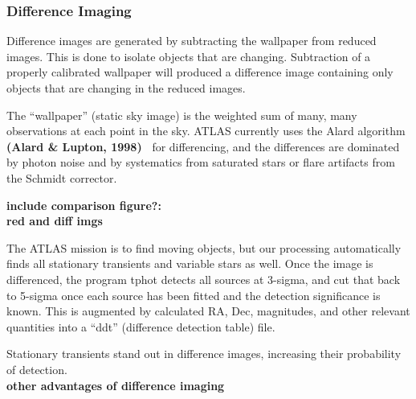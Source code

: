 \documentclass[aps,prb,twocolumn,superscriptaddress]{revtex4-1}
\begin{document}
\subsubsection{Difference Imaging}\label{sec:diffimg}

Difference images are generated by subtracting the wallpaper from reduced 
images. This is done to isolate objects that are changing. Subtraction 
of a properly calibrated wallpaper will produced a difference image 
containing only objects that are changing in the reduced images.  

The ``wallpaper'' (static sky image) is the weighted sum of many, many
observations at each point in the sky.  ATLAS currently uses the
Alard algorithm {\bf (Alard \& Lupton, 1998)~\cite{Alard_algorithm}} for differencing, and the
differences are dominated by photon noise and by systematics from
saturated stars or flare artifacts from the Schmidt corrector.

{\bf\noindent include comparison figure?:\\ \indent red and diff imgs}

The ATLAS mission is to find moving objects, but our processing
automatically finds all stationary transients and variable stars as
well.  Once the image is differenced, the program tphot detects all
sources at 3-sigma, and cut that back to 5-sigma once each source
has been fitted and the detection significance is known.  
This is augmented by calculated RA, Dec, magnitudes, and other relevant
quantities into a ``ddt'' (difference detection table) file.

Stationary transients stand out in difference images, increasing their probability of detection.\\
{\bf other advantages of difference imaging\\}
\end{document}

